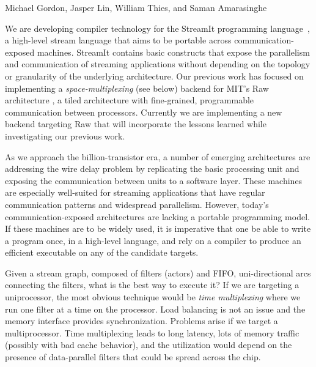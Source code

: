 \documentclass{csailabstractbook}
\begin{document}


         {Michael Gordon, Jasper Lin, William Thies, and Saman Amarasinghe}


We are developing compiler technology for the StreamIt programming
language~\cite{streamitcc}, a high-level stream language that aims to
be portable across communication-exposed machines.  StreamIt contains
basic constructs that expose the parallelism and communication of
streaming applications without depending on the topology or
granularity of the underlying architecture.  Our previous work
\cite{streamit-asplos} has focused on 
implementing a {\it space-multiplexing} (see below) backend for
MIT's Raw architecture \cite{raw}, a tiled architecture 
with fine-grained, programmable communication between processors.
Currently we are implementing a new backend targeting Raw that will
incorporate the lessons learned while investigating our previous work.

As we approach the billion-transistor era, a number of emerging
architectures are addressing the wire delay problem by replicating the
basic processing unit and exposing the communication between units to
a software layer.  These machines are especially well-suited for
streaming applications that have regular communication patterns and
widespread parallelism.  However, today's communication-exposed
architectures are lacking a portable programming model.  If these
machines are to be widely used, it is imperative that one be able to
write a program once, in a high-level language, and rely on a compiler
to produce an efficient executable on any of the candidate targets.


Given a stream graph, composed of filters (actors) and FIFO,
uni-directional arcs connecting the filters, what is the best way to
execute it?  If we are targeting a uniprocessor, the most obvious
technique would be {\it time multiplexing} where we run one filter at
a time on the processor.  Load balancing is not an issue and the
memory interface provides synchronization.  Problems arise if we
target a multiprocessor.  Time multiplexing leads to long latency,
lots of memory traffic (possibly with bad cache behavior), and the
utilization would depend on the presence of data-parallel filters that
could be spread across the chip.
\end{document}
